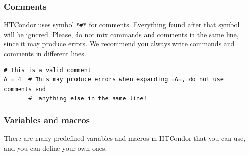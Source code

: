 \documentclass[a4paper,10pt]{article}
\begin{document}
\subsubsection{Comments}
\label{sec:org02b553d}

HTCondor uses symbol \texttt{*\#*} for comments. Everything found after that symbol will
be ignored. Please, do not mix commands and comments in the same line, since it
may produce errors. We recommend you always write commands and comments in
different lines.

\begin{verbatim}
# This is a valid comment
A = 4  # This may produce errors when expanding =A=, do not use comments and 
       #  anything else in the same line!
\end{verbatim}

\subsubsection{Variables and macros}
\label{sec:org2bacc60}

There are many predefined variables and macros in HTCondor that you can use, and
you can define your own ones.
\end{document}
